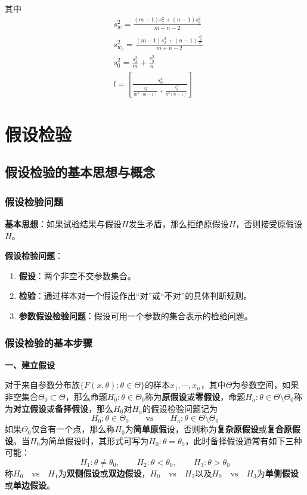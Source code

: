 \documentclass[lang = cn, scheme = chinese, thmcnt = section]{elegantbook}
\newcommand{\sub}{\subset}             %
\begin{document}
其中
\begin{align*}
	& s_w^2=\frac{(m-1)s_x^2+(n-1)s_y^2}{m+n-2}\\
	& s_{w_c}^2=\frac{(m-1)s_x^2+(n-1)\frac{s_y^2}{c}}{m+n-2}\\
	& s_0^2=\frac{s_x^2}{m}+\frac{s_y^2}{n}\\
	& l=\left[ \frac{s_0^4}{\frac{s_x^4}{m^2(m-1)}+\frac{s_y^4}{n^2(n-1)}} \right]
\end{align*}

\chapter{假设检验}

\section{假设检验的基本思想与概念}

\subsection{假设检验问题}

\textbf{基本思想}：如果试验结果与假设$H$发生矛盾，那么拒绝原假设$H$，否则接受原假设$H$。

\textbf{假设检验问题}：

\begin{enumerate}
	\item \textbf{假设}：两个非空不交参数集合。
	\item \textbf{检验}：通过样本对一个假设作出“对”或“不对”的具体判断规则。
	\item \textbf{参数假设检验问题}：假设可用一个参数的集合表示的检验问题。
\end{enumerate}

\subsection{假设检验的基本步骤}

\textbf{一、建立假设}

对于来自参数分布族$\{ F(x,\theta):\theta\in\Theta \}$的样本$x_1,\cdots,x_n$，其中$\Theta$为参数空间，如果非空集合$\Theta_0\sub\Theta$，那么命题$H_0:\theta\in\Theta_0$称为\textbf{原假设}或\textbf{零假设}，命题$H_a:\theta\in\Theta\setminus\Theta_0$称为\textbf{对立假设}或\textbf{备择假设}，那么$H_0$对$H_a$的假设检验问题记为
$$
H_0:\theta\in\Theta_0 \qquad
\mathrm{vs}
\qquad H_a:\theta\in\Theta\setminus\Theta_0
$$
如果$\Theta_0$仅含有一个点，那么称$H_0$为\textbf{简单原假}设，否则称为\textbf{复杂原假设}或\textbf{复合原假设}。当$H_0$为简单假设时，其形式可写为$H_0:\theta=\theta_0$，此时备择假设通常有如下三种可能：
$$
H_1:\theta\ne\theta_0,\qquad
H_2:\theta<\theta_0,\qquad
H_3:\theta>\theta_0
$$
称$H_0\quad\mathrm{vs}\quad H_1$为\textbf{双侧假设}或\textbf{双边假设}，$H_0\quad\mathrm{vs}\quad H_2$以及$H_0\quad\mathrm{vs}\quad H_3$为\textbf{单侧假设}或\textbf{单边假设}。
\end{document}
